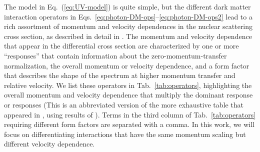 \documentclass[11pt]{article}
\newcommand{\Eq}[1]{Eq.~(\ref{#1})} \newcommand{\Eqs}[2]{Eqs.~(\ref{#1}) and (\ref{#2})} \newcommand{\Eqm}[2]{Eqs.~(\ref{#1}) through (\ref{#2})}
\newcommand{\Tab}[1]{Tab.~\ref{#1}}
\begin{document}
The model in \Eq{eq:UV-model} is quite simple, but the different dark matter interaction operators in Eqs.~\ref{eq:photon-DM-ops}--\ref{eq:photon-DM-ops2} lead to a rich assortment of momentum and velocity dependences in the nuclear scattering cross section, as described in detail in \cite{Gresham:2014vja, Gluscevic:2015sqa}. The momentum and velocity dependence that appear in the differential cross section are characterized by one or more ``responses'' that contain information about the zero-momentum-transfer normalization, the overall momentum or velocity dependence, and a form factor that describes the shape of the spectrum at higher momentum transfer and relative velocity. We list these operators in \Tab{tab:operators}, highlighting the overall momentum and velocity dependence that multiply the dominant response or responses (This is an abbreviated version of the more exhaustive table that appeared in \cite{Gluscevic:2015sqa}, using results of \cite{Gresham:2014vja, Gluscevic:2015sqa}). Terms in the third column of \Tab{tab:operators} requiring different form factors are separated with a comma. In this work, we will focus on differentiating interactions that have the same momentum scaling but different velocity dependence.
\end{document}
